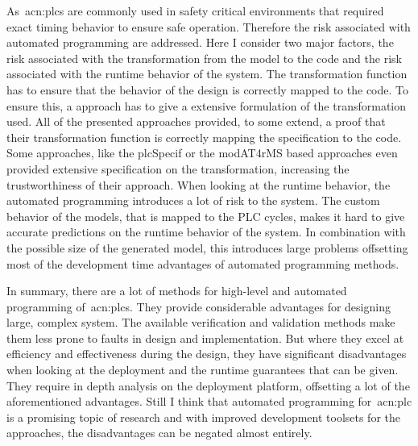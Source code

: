 As~\acrshort{acn:plc}s are commonly used in safety critical environments that required exact timing behavior to ensure safe operation.
Therefore the risk associated with automated programming are addressed.
Here I consider two major factors, the risk associated with the transformation from the model to the code and the risk associated with the runtime behavior of the system.
The transformation function has to ensure that the behavior of the design is correctly mapped to the code.
To ensure this, a approach has to give a extensive formulation of the transformation used.
All of the presented approaches provided, to some extend, a proof that their transformation function is correctly mapping the specification to the code.
Some approaches, like the plcSpecif or the modAT4rMS based approaches even provided extensive specification on the transformation, increasing the trustworthiness of their approach.
When looking at the runtime behavior, the automated programming introduces a lot of risk to the system.
The custom behavior of the models, that is mapped to the PLC cycles, makes it hard to give accurate predictions on the runtime behavior of the system.
In combination with the possible size of the generated model, this introduces large problems offsetting most of the development time advantages of automated programming methods.

In summary, there are a lot of methods for high-level and automated programming of~\acrlong{acn:plc}s.
They provide considerable advantages for designing large, complex system.
The available verification and validation methods make them less prone to faults in design and implementation.
But where they excel at efficiency and effectiveness during the design, they have significant disadvantages when looking at the deployment and the runtime guarantees that can be given.
They require in depth analysis on the deployment platform, offsetting a lot of the aforementioned advantages.
Still I think that automated programming for~\acrshort{acn:plc} is a promising topic of research and with improved development toolsets for the approaches, the disadvantages can be negated almost entirely.